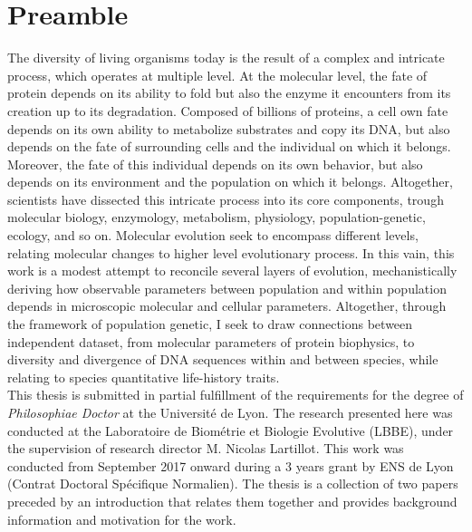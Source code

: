 \chapter*{Preamble}
The diversity of living organisms today is the result of a complex and intricate process, which operates at multiple level.
At the molecular level, the fate of protein depends on its ability to fold but also the enzyme it encounters from its creation up to its degradation. 
Composed of billions of proteins, a cell own fate depends on its own ability to metabolize substrates and copy its \acrshort{DNA}, but also depends on the fate of surrounding cells and the individual on which it belongs.
Moreover, the fate of this individual depends on its own behavior, but also depends on its environment and the population on which it belongs.
Altogether, scientists have dissected this intricate process into its core components, trough molecular biology, enzymology, metabolism, physiology, population-genetic, ecology, and so on. 
Molecular evolution seek to encompass different levels, relating molecular changes to higher level evolutionary process.
In this vain, this work is a modest attempt to reconcile several layers of evolution, mechanistically deriving how observable parameters between population and within population depends in microscopic molecular and cellular parameters.
Altogether, through the framework of population genetic, I seek to draw connections between independent dataset, from molecular parameters of protein biophysics, to diversity and divergence of \acrshort{DNA} sequences within and between species, while relating to species quantitative life-history traits.\\

This thesis is submitted in partial fulfillment of the requirements
for the degree of \emph{Philosophiae Doctor} at the Université de Lyon.
The research presented here was conducted at the Laboratoire de Biométrie et Biologie Evolutive (LBBE), under the supervision of research director M. Nicolas Lartillot.
This work was conducted from September 2017 onward during a 3 years grant by ENS de Lyon (Contrat Doctoral Spécifique Normalien).
The thesis is a collection of two papers preceded by an introduction that relates them together and provides background information and motivation for the work.